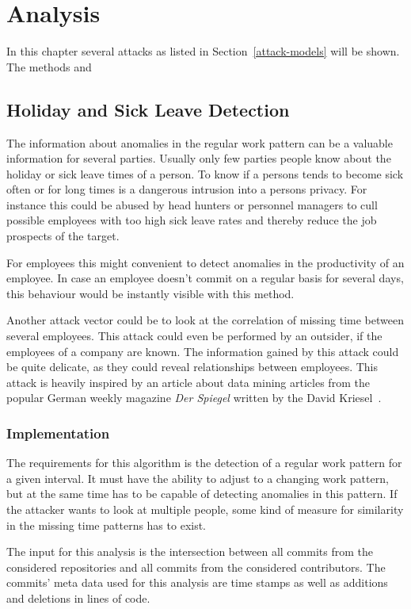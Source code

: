 \chapter{Analysis}\label{analysis}
In this chapter several attacks as listed in Section~\ref{attack-models} will be shown. The methods and

\section{Holiday and Sick Leave Detection}

The information about anomalies in the regular work pattern can be a valuable information for several parties.
Usually only few parties people know about the holiday or sick leave times of a person.
To know if a persons tends to become sick often or for long times is a dangerous intrusion into a persons privacy.
For instance this could be abused by head hunters or personnel managers to cull possible employees with too high sick leave rates and thereby reduce the job prospects of the target.

For employees this might convenient to detect anomalies in the productivity of an employee.
In case an employee doesn't commit on a regular basis for several days, this behaviour would be instantly visible with this method.

Another attack vector could be to look at the correlation of missing time between several employees.
This attack could even be performed by an outsider, if the employees of a company are known.
The information gained by this attack could be quite delicate, as they could reveal relationships between employees.
This attack is heavily inspired by an article about data mining articles from the popular German weekly magazine \emph{Der Spiegel} written by the David Kriesel~\cite{article:spiegel-mining}.


\subsection{Implementation}

The requirements for this algorithm is the detection of a regular work pattern for a given interval.
It must have the ability to adjust to a changing work pattern, but at the same time has to be capable of detecting anomalies in this pattern.
If the attacker wants to look at multiple people, some kind of measure for similarity in the missing time patterns has to exist.

The input for this analysis is the intersection between all commits from the considered repositories and all commits from the considered contributors.
The commits' meta data used for this analysis are time stamps as well as additions and deletions in lines of code.


